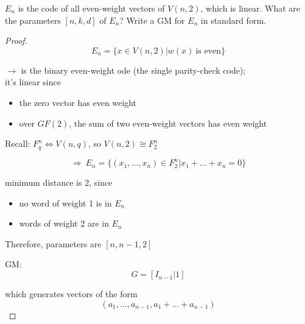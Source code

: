 \documentclass{article}
\theoremstyle{definition}
\newenvironment{ex}[1]
{\renewcommand\theinnerex{#1}\innerex}
{\endinnerex}
\newcommand{\Vnq}{V(n, q)}
\begin{document}
\begin{ex}{5.2} \label{ex.5.2}
  $E_n$ is the code of all even-weight vectors of $V(n,2)$, which is linear.
  What are the parameters $[n, k, d]$ of $E_n$? Write a GM for $E_n$ in standard
  form.
\end{ex}
\begin{proof}
  $$E_n = \{ x \in V(n, 2) | w(x) ~\text{is even} \}$$

  $\longrightarrow$ is the binary even-weight ode (the single parity-check code);\\
  it's linear since
  \begin{itemize}
    \item the zero vector has even weight
    \item over $GF(2)$, the sum of two even-weight vectors has even weight
  \end{itemize}

  Recall: $F_q^n \Longleftrightarrow \Vnq$, so $V(n, 2) \cong F_2^n$

  $$\Longrightarrow~ E_n = \{ (x_1, \ldots, x_n) \in F_2^n | x_1 + \ldots + x_n = 0 \}$$

  minimum distance is $2$, since
  \begin{itemize}
    \item no word of weight 1 is in $E_n$
    \item words of weight 2 are in $E_n$
  \end{itemize}

  Therefore, parameters are $[n, n-1, 2]$

  GM:
  $$G=\left[ I_{n-1} | 1 \right]$$

  which generates vectors of the form
  $$(a_1, \ldots, a_{n-1}, a_1+\ldots+a_{n-1})$$
\end{proof}
\end{document}
